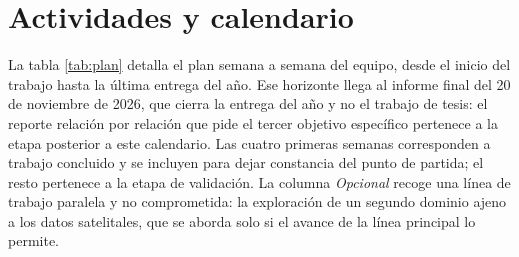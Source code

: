 \section{Actividades y calendario}

La tabla \ref{tab:plan} detalla el plan semana a semana del equipo, desde el inicio del trabajo hasta la última entrega del año. Ese horizonte llega al informe final del 20 de noviembre de 2026, que cierra la entrega del año y no el trabajo de tesis: el reporte relación por relación que pide el tercer objetivo específico pertenece a la etapa posterior a este calendario. Las cuatro primeras semanas corresponden a trabajo concluido y se incluyen para dejar constancia del punto de partida; el resto pertenece a la etapa de validación. La columna \emph{Opcional} recoge una línea de trabajo paralela y no comprometida: la exploración de un segundo dominio ajeno a los datos satelitales, que se aborda solo si el avance de la línea principal lo permite.

